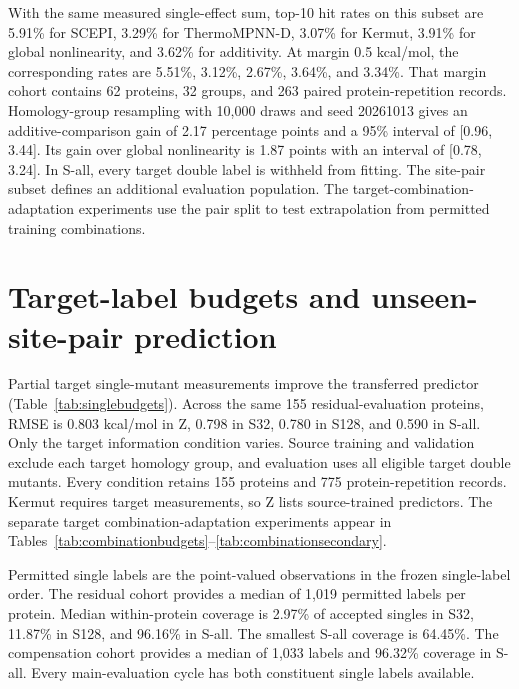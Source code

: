\documentclass{llncs}
\begin{document}
With the same measured single-effect sum, top-10 hit rates on this subset are 5.91\% for SCEPI, 3.29\% for ThermoMPNN-D, 3.07\% for Kermut, 3.91\% for global nonlinearity, and 3.62\% for additivity. At margin 0.5 kcal/mol, the corresponding rates are 5.51\%, 3.12\%, 2.67\%, 3.64\%, and 3.34\%. That margin cohort contains 62 proteins, 32 groups, and 263 paired protein-repetition records. Homology-group resampling with 10,000 draws and seed 20261013 gives an additive-comparison gain of 2.17 percentage points and a 95\% interval of [0.96, 3.44]. Its gain over global nonlinearity is 1.87 points with an interval of [0.78, 3.24]. In S-all, every target double label is withheld from fitting. The site-pair subset defines an additional evaluation population. The target-combination-adaptation experiments use the pair split to test extrapolation from permitted training combinations.

\section{Target-label budgets and unseen-site-pair prediction}

Partial target single-mutant measurements improve the transferred predictor (Table~\ref{tab:singlebudgets}). Across the same 155 residual-evaluation proteins, RMSE is 0.803 kcal/mol in Z, 0.798 in S32, 0.780 in S128, and 0.590 in S-all. Only the target information condition varies. Source training and validation exclude each target homology group, and evaluation uses all eligible target double mutants. Every condition retains 155 proteins and 775 protein-repetition records. Kermut requires target measurements, so Z lists source-trained predictors. The separate target combination-adaptation experiments appear in Tables~\ref{tab:combinationbudgets}--\ref{tab:combinationsecondary}.

Permitted single labels are the point-valued observations in the frozen single-label order. The residual cohort provides a median of 1,019 permitted labels per protein. Median within-protein coverage is 2.97\% of accepted singles in S32, 11.87\% in S128, and 96.16\% in S-all. The smallest S-all coverage is 64.45\%. The compensation cohort provides a median of 1,033 labels and 96.32\% coverage in S-all. Every main-evaluation cycle has both constituent single labels available.
\end{document}
